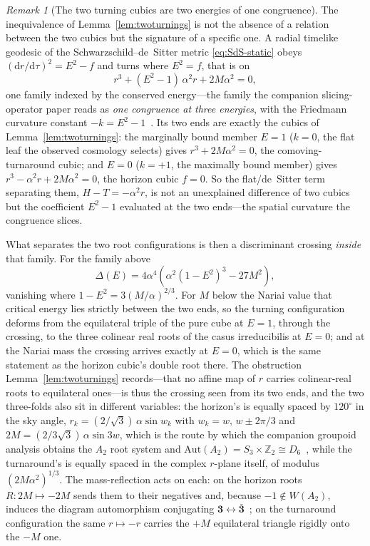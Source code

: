 \documentclass[11pt,a4paper]{article}
\theoremstyle{plain}
\theoremstyle{definition}
\theoremstyle{remark}
\newtheorem{remark}{Remark}
\begin{document}
\begin{remark}[The two turning cubics are two energies of one congruence]\label{rem:tworealisations}
The inequivalence of Lemma~\ref{lem:twoturnings} is not the absence of a relation between the two cubics but the signature of a specific one. A radial timelike geodesic of the Schwarzschild--de~Sitter metric \eqref{eq:SdS-static} obeys $(\mathrm{d}r/\mathrm{d}\tau)^2=E^2-f$ and turns where $E^2=f$, that is on
\[
r^{3}+(E^{2}-1)\,\alpha^{2}r+2M\alpha^{2}=0 ,
\]
one family indexed by the conserved energy---the family the companion slicing-operator paper reads as \emph{one congruence at three energies}, with the Friedmann curvature constant $-k=E^{2}-1$~\cite{JanzenOperator}. Its two ends are exactly the cubics of Lemma~\ref{lem:twoturnings}: the marginally bound member $E=1$ ($k=0$, the flat leaf the observed cosmology selects) gives $r^{3}+2M\alpha^{2}=0$, the comoving-turnaround cubic; and $E=0$ ($k=+1$, the maximally bound member) gives $r^{3}-\alpha^{2}r+2M\alpha^{2}=0$, the horizon cubic $f=0$. So the flat/de~Sitter term separating them, $H-T=-\alpha^{2}r$, is not an unexplained difference of two cubics but the coefficient $E^{2}-1$ evaluated at the two ends---the spatial curvature the congruence slices.

What separates the two root configurations is then a discriminant crossing \emph{inside} that family. For the family above
\[
\Delta(E)=4\alpha^{4}\!\left(\alpha^{2}(1-E^{2})^{3}-27M^{2}\right),
\]
vanishing where $1-E^{2}=3(M/\alpha)^{2/3}$. For $M$ below the Nariai value that critical energy lies strictly between the two ends, so the turning configuration deforms from the equilateral triple of the pure cube at $E=1$, through the crossing, to the three colinear real roots of the casus irreducibilis at $E=0$; and at the Nariai mass the crossing arrives exactly at $E=0$, which is the same statement as the horizon cubic's double root there. The obstruction Lemma~\ref{lem:twoturnings} records---that no affine map of $r$ carries colinear-real roots to equilateral ones---is thus the crossing seen from its two ends, and the two three-folds also sit in different variables: the horizon's is equally spaced by $120^{\circ}$ in the sky angle, $r_k=(2/\sqrt3)\,\alpha\sin w_k$ with $w_k=w,\,w\pm2\pi/3$ and $2M=(2/3\sqrt3)\,\alpha\sin 3w$, which is the route by which the companion groupoid analysis obtains the $A_2$ root system and $\mathrm{Aut}(A_2)=S_3\times\mathbb{Z}_2\cong D_6$~\cite{JanzenGroupoid}, while the turnaround's is equally spaced in the complex $r$-plane itself, of modulus $(2M\alpha^{2})^{1/3}$. The mass-reflection acts on each: on the horizon roots $R:2M\mapsto-2M$ sends them to their negatives and, because $-1\notin W(A_2)$, induces the diagram automorphism conjugating $\mathbf 3\leftrightarrow\bar{\mathbf 3}$~\cite{JanzenGroupoid}; on the turnaround configuration the same $r\mapsto-r$ carries the $+M$ equilateral triangle rigidly onto the $-M$ one.


\end{remark}
\end{document}
